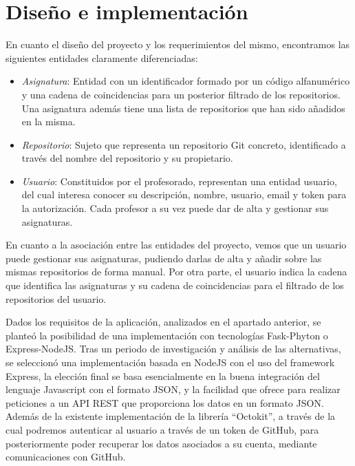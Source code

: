 \chapter{Diseño e implementación\label{05disenoTrabajo}}


En cuanto el diseño del proyecto y los requerimientos del mismo, encontramos las siguientes entidades claramente diferenciadas:
\begin{itemize}
  \item \emph{Asignatura}: Entidad con un identificador formado por un código alfanumérico y una cadena de coincidencias para un posterior filtrado de los repositorios. Una asignatura además tiene una lista de repositorios que han sido añadidos en la misma.
  \item \emph{Repositorio}: Sujeto que representa un repositorio Git concreto, identificado a través del nombre del repositorio y su propietario.
  \item \emph{Usuario}: Constituidos por el profesorado, representan una entidad usuario, del cual interesa conocer su descripción, nombre, usuario, email y token para la autorización. Cada profesor a su vez puede dar de alta y gestionar sus asignaturas.
\end{itemize}

En cuanto a la asociación entre las entidades del proyecto, vemos que un usuario puede gestionar sus asignaturas, pudiendo darlas de alta y añadir sobre las mismas repositorios de forma manual. Por otra parte, el usuario indica la cadena que identifica las asignaturas y su cadena de coincidencias para el filtrado de los repositorios del usuario.

Dados los requisitos de la aplicación, analizados en el apartado anterior, se planteó la posibilidad de una implementación con tecnologías Fask-Phyton o Express-NodeJS. Tras un periodo de investigación y análisis de las alternativas, se seleccionó una implementación basada en NodeJS con el uso del framework Express, la elección final se basa esencialmente en la buena integración del
lenguaje Javascript con el formato JSON, y la facilidad que ofrece para
realizar peticiones a un API REST que proporciona los datos en un formato
JSON. Además de la existente implementación de la librería “Octokit”\cite{Octokit,OctokitDoc}, a través de la cual podremos autenticar al usuario a través de un token de GitHub, para posteriormente poder recuperar los datos asociados a su cuenta, mediante comunicaciones con GitHub.

